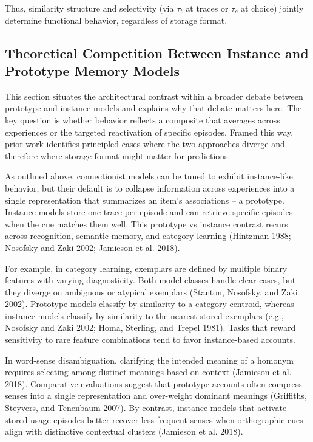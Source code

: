 \documentclass[
  letterpaper,
  11pt,
  english,
  singlespacing,
  headsepline]{MastersDoctoralThesis}
\begin{document}
Thus, similarity structure and selectivity (via \(\tau_t\) at traces or
\(\tau_c\) at choice) jointly determine functional behavior, regardless
of storage format.

\subsection{Theoretical Competition Between Instance and Prototype
Memory
Models}\label{theoretical-competition-between-instance-and-prototype-memory-models}

This section situates the architectural contrast within a broader debate
between prototype and instance models and explains why that debate
matters here. The key question is whether behavior reflects a composite
that averages across experiences or the targeted reactivation of
specific episodes. Framed this way, prior work identifies principled
cases where the two approaches diverge and therefore where storage
format might matter for predictions.

As outlined above, connectionist models can be tuned to exhibit
instance-like behavior, but their default is to collapse information
across experiences into a single representation that summarizes an
item's associations -- a prototype. Instance models store one trace per
episode and can retrieve specific episodes when the cue matches them
well. This prototype vs instance contrast recurs across recognition,
semantic memory, and category learning (Hintzman 1988; Nosofsky and Zaki
2002; Jamieson et al. 2018).

For example, in category learning, exemplars are defined by multiple
binary features with varying diagnosticity. Both model classes handle
clear cases, but they diverge on ambiguous or atypical exemplars
(Stanton, Nosofsky, and Zaki 2002). Prototype models classify by
similarity to a category centroid, whereas instance models classify by
similarity to the nearest stored exemplars (e.g., Nosofsky and Zaki
2002; Homa, Sterling, and Trepel 1981). Tasks that reward sensitivity to
rare feature combinations tend to favor instance-based accounts.

In word-sense disambiguation, clarifying the intended meaning of a
homonym requires selecting among distinct meanings based on context
(Jamieson et al. 2018). Comparative evaluations suggest that prototype
accounts often compress senses into a single representation and
over-weight dominant meanings (Griffiths, Steyvers, and Tenenbaum 2007).
By contrast, instance models that activate stored usage episodes better
recover less frequent senses when orthographic cues align with
distinctive contextual clusters (Jamieson et al. 2018).
\end{document}
